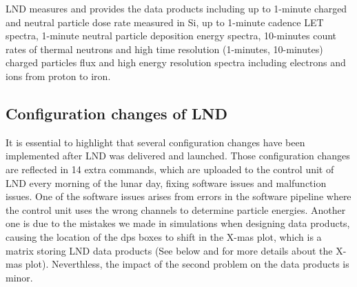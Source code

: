 \ac{LND} measures and provides the data products including up to 1-minute charged and neutral particle dose rate measured in Si, up to 1-minute cadence \ac{LET} spectra, 1-minute neutral particle deposition energy spectra, 10-minutes count rates of thermal neutrons and high time resolution (1-minutes, 10-minutes) charged particles flux and high energy resolution spectra including electrons and ions from proton to iron.


\subsection*{Configuration changes of LND}

It is essential to highlight that several configuration changes have been implemented after \ac{LND} was delivered and launched. Those configuration changes are reflected in 14 extra commands, which are uploaded to the control unit of \ac{LND} every morning of the lunar day, fixing software issues and malfunction issues. One of the software issues arises from errors in the software pipeline where the control unit uses the wrong channels to determine particle energies. Another one is due to the mistakes we made in simulations when designing data products, causing the location of the \ac{dps} boxes to shift in the X-mas plot, which is a matrix storing \ac{LND} data products (See below and \citet{Wimmer2020SSRv} for more details about the X-mas plot). Neverthless, the impact of the second problem on the data products is minor. 

